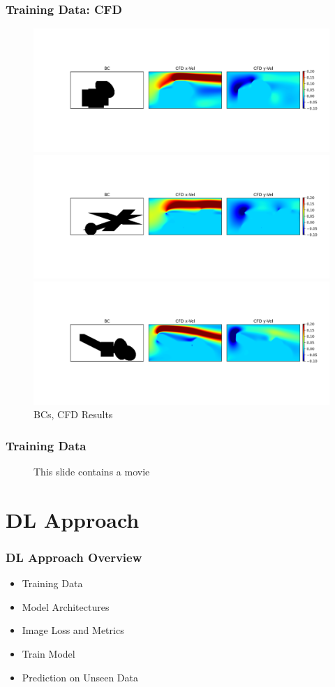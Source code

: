 \documentclass{beamer}
\begin{document}
\begin{frame}
\frametitle{Training Data: CFD}
\begin{figure}[!htb]%

\includegraphics[height=0.20\linewidth, trim = 3.80cm 3.4cm 1.3cm 3.90cm, clip]{../../../plots/plots/train_data/montage_train_data_16.png}%
        
\includegraphics[height=0.20\linewidth, trim = 3.80cm 3.4cm 1.3cm 3.90cm, clip]{../../../plots/plots/train_data/montage_train_data_17.png}%

\includegraphics[height=0.20\linewidth, trim = 3.80cm 3.4cm 1.3cm 3.90cm, clip]{../../../plots/plots/train_data/montage_train_data_18.png}%
\vspace{-0.20cm}
\caption{BCs, CFD Results}
\end{figure}
\end{frame}


\begin{frame}
\frametitle{Training Data}
\begin{figure}[!htb]%
\caption{This slide contains a movie}
\end{figure}
\end{frame} 


\section{DL Approach} %
\begin{frame}
\frametitle{DL Approach Overview}
\begin{itemize}
\item Training Data ~\parencite{hennighTrain}
\item Model Architectures
\item Image Loss and Metrics
\item Train Model
\item Prediction on Unseen Data
\end{itemize}
\end{frame}
\end{document}
